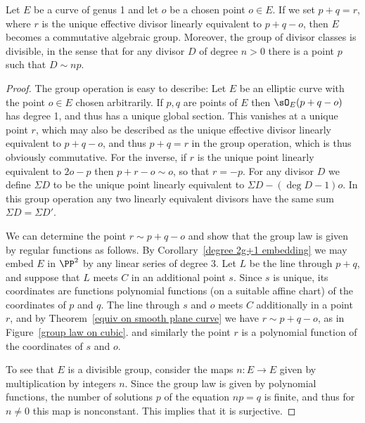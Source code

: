 \begin{proposition}\label{group law} Let $E$ be a curve of genus 1 and let $o$ be a chosen point $o\in E$.
If we set $p+q = r$, where $r$ is the unique effective divisor
linearly equivalent to $p+q-o$, then $E$ becomes a
commutative algebraic group.
Moreover, the group of divisor classes is
divisible,
%
in the sense that for any divisor $D$ of degree $n>0$
 there is a point $p$ such that $D\sim np$.
\unif
 \end{proposition}

\begin{proof}
 The group operation is easy to describe:
Let $E$ be an elliptic curve with the point $o\in E$ chosen arbitrarily. If $p,q$ are points of $E$ then $\sO_E(p+q-o)$ has degree 1, and
thus has a unique global section. This vanishes at a unique point $r$, which may also be described as the unique
effective divisor linearly equivalent to $p+q-o$, and thus
$p+q = r$ in the group operation, which is thus obviously commutative. For the inverse, if $r$ is the  unique point
linearly equivalent to $2o-p$ then $p+r-o\sim o$, so that $r=-p$. For any divisor $D$
we define
%
$\Sigma D$
to be the unique point linearly equivalent to $\Sigma D-(\deg D-1)o$.
In this group operation any two linearly
equivalent divisors have the same sum $\Sigma D = \Sigma D'$.

We can determine the point $r\sim p+q-o$ and show that the group law
is given by
regular functions
%
as follows. By Corollary~\ref{degree 2g+1 embedding} we may embed $E$ in $\PP^2$ by any linear series
of degree 3.  Let $L$ be the line through $p+q$, and suppose that
$L$ meets $C$ in an additional point $s$. Since $s$ is unique, its coordinates are functions
polynomial functions
%
(on a suitable affine chart) of the coordinates of $p$ and $q$. The line through $s$ and $o$ meets $C$ additionally in a point $r$,
and by Theorem~\ref{equiv on smooth plane curve} we have $r\sim p+q-o$, as in Figure~\ref{group law on cubic}.
and similarly the point $r$ is a polynomial function of the coordinates of $s$ and $o$.

To see that $E$ is a divisible group, consider the maps $n: E\to E$ given by multiplication by integers $n$. Since the
group law is given by polynomial functions, the number of solutions $p$ of the equation $np = q$ is finite, and thus
for $n\neq 0$ this map is nonconstant. This implies that it is surjective.
\end{proof}

